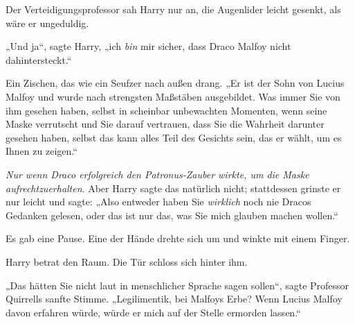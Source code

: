 Der Verteidigungsprofessor sah Harry nur an, die Augenlider leicht gesenkt, als wäre er ungeduldig.

„Und ja“, sagte Harry, „ich \emph{bin} mir sicher, dass Draco Malfoy nicht dahintersteckt.“

Ein Zischen, das wie ein Seufzer nach außen drang.
„Er ist der Sohn von Lucius Malfoy und wurde nach strengsten Maßstäben ausgebildet. Was immer Sie von ihm gesehen haben, selbst in scheinbar unbewachten Momenten, wenn seine Maske verrutscht und Sie darauf vertrauen, dass Sie die Wahrheit darunter gesehen haben, selbst das kann alles Teil des Gesichts sein, das er wählt, um es Ihnen zu zeigen.“

\emph{Nur wenn Draco erfolgreich den Patronus-Zauber wirkte, um die Maske aufrechtzuerhalten}. Aber Harry sagte das natürlich nicht; stattdessen grinste er nur leicht und sagte:
„Also entweder haben Sie \emph{wirklich} noch nie Dracos Gedanken gelesen, oder das ist nur das, was Sie mich glauben machen wollen.“

Es gab eine Pause. Eine der Hände drehte sich um und winkte mit einem Finger.

Harry betrat den Raum. Die Tür schloss sich hinter ihm.

„Das hätten Sie nicht laut in menschlicher Sprache sagen sollen“, sagte Professor Quirrells sanfte Stimme.
„Legilimentik, bei Malfoys Erbe? Wenn Lucius Malfoy davon erfahren würde, würde er mich auf der Stelle ermorden lassen.“

